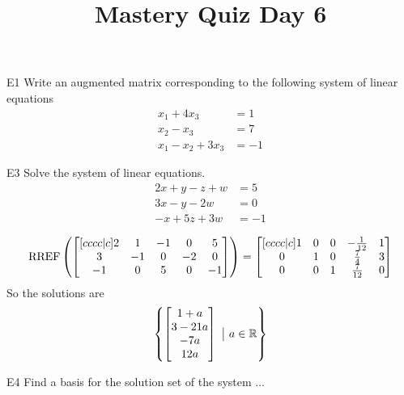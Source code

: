 \documentclass{sbgLAquiz}
\title{Mastery Quiz Day 6 }
\begin{document}
\begin{problem}{E1}
Write an augmented matrix corresponding to the following system of linear equations
\begin{align*}
x_1+4x_3 &= 1 \\
x_2-x_3 &= 7 \\
x_1-x_2+3x_3 &= -1
\end{align*}
\end{problem}
\begin{problem}{E3} 
Solve the system of linear equations.
\begin{align*}
2x+y-z+w &=5 \\
3x-y-2w &= 0 \\
-x+5z+3w&=-1
\end{align*}
\end{problem}
\begin{solution}
$$\operatorname{RREF}\left( \begin{bmatrix}[cccc|c] 2 & 1 & -1 & 0 & 5 \\ 3 & -1 & 0 & -2 & 0 \\ -1 & 0 & 5 & 0 & -1 \end{bmatrix} \right) = \begin{bmatrix}[cccc|c] 1 & 0 & 0 & -\frac{1}{12} & 1 \\ 0 & 1 & 0 & \frac{7}{4} & 3 \\ 0 & 0 & 1 & \frac{7}{12} & 0 \end{bmatrix}$$
So the solutions are $$\left\{ \begin{bmatrix} 1+a \\ 3-21a \\ -7a \\ 12a \end{bmatrix}\ \big|\ a \in \mathbb{R}\right\}$$
\end{solution}
\begin{extract}\newpage\end{extract}
\begin{problem}{E4}
Find a basis for the solution set of the system ...
\end{problem}
\end{document}
